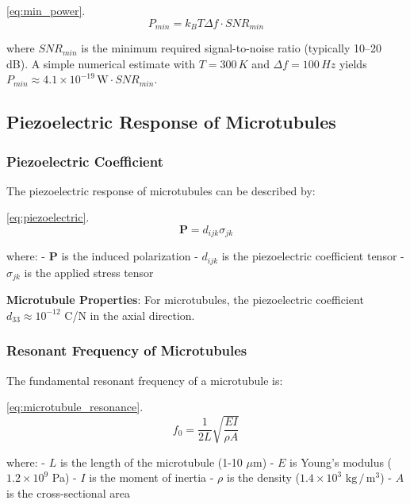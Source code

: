\documentclass[
  13pt,
  a4paperpaper,
  12pt]{article}
\begin{document}
\eqref{eq:min_power}. \begin{equation}
P_{min} = k_B T \Delta f \cdot SNR_{min} \label{eq:min_power}
\end{equation}

where \(SNR_{min}\) is the minimum required signal-to-noise ratio
(typically 10--20 dB). A simple numerical estimate with \(T=300\,K\) and
\(\Delta f=100\,Hz\) yields
\(P_{min}\approx4.1\times10^{-19}\,\text{W}\cdot SNR_{min}\).

\subsection{Piezoelectric Response of
Microtubules}\label{piezoelectric-response-of-microtubules}

\subsubsection{Piezoelectric
Coefficient}\label{piezoelectric-coefficient}

The piezoelectric response of microtubules can be described by:

\eqref{eq:piezoelectric}. \begin{equation}
\mathbf{P} = d_{ijk} \sigma_{jk} \label{eq:piezoelectric}
\end{equation}

where: - \(\mathbf{P}\) is the induced polarization - \(d_{ijk}\) is the
piezoelectric coefficient tensor - \(\sigma_{jk}\) is the applied stress
tensor

\textbf{Microtubule Properties}: For microtubules, the piezoelectric
coefficient \(d_{33} \approx 10^{-12}\) C/N in the axial direction.

\subsubsection{Resonant Frequency of
Microtubules}\label{resonant-frequency-of-microtubules}

The fundamental resonant frequency of a microtubule is:

\eqref{eq:microtubule_resonance}. \begin{equation}
f_0 = \frac{1}{2L} \sqrt{\frac{EI}{\rho A}} \label{eq:microtubule_resonance}
\end{equation}

where: - \(L\) is the length of the microtubule (1-10 \(\mu\mathrm{m}\))
- \(E\) is Young's modulus (\(1.2 \times 10^9\) Pa) - \(I\) is the
moment of inertia - \(\rho\) is the density (\(1.4 \times 10^3\)
\(\mathrm{kg}\,/\,\mathrm{m}^3\)) - \(A\) is the cross-sectional area
\end{document}
